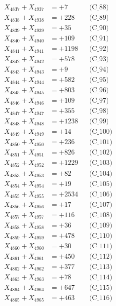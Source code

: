 \documentclass[a4paper,10pt]{article}
\begin{document}
{\begin{align}
X_{4837} + X_{4937} &= +7 && \text{(C\_88)} \\
X_{4838} + X_{4938} &= +228 && \text{(C\_89)} \\
X_{4839} + X_{4939} &= +35 && \text{(C\_90)} \\
\allowbreak
X_{4840} + X_{4940} &= +109 && \text{(C\_91)} \\
X_{4841} + X_{4941} &= +1198 && \text{(C\_92)} \\
X_{4842} + X_{4942} &= +578 && \text{(C\_93)} \\
X_{4843} + X_{4943} &= +9 && \text{(C\_94)} \\
X_{4844} + X_{4944} &= +582 && \text{(C\_95)} \\
\allowbreak
X_{4845} + X_{4945} &= +803 && \text{(C\_96)} \\
X_{4846} + X_{4946} &= +109 && \text{(C\_97)} \\
X_{4847} + X_{4947} &= +355 && \text{(C\_98)} \\
X_{4848} + X_{4948} &= +1238 && \text{(C\_99)} \\
X_{4849} + X_{4949} &= +14 && \text{(C\_100)} \\
\allowbreak
X_{4850} + X_{4950} &= +236 && \text{(C\_101)} \\
X_{4851} + X_{4951} &= +826 && \text{(C\_102)} \\
X_{4852} + X_{4952} &= +1229 && \text{(C\_103)} \\
X_{4853} + X_{4953} &= +82 && \text{(C\_104)} \\
X_{4854} + X_{4954} &= +19 && \text{(C\_105)} \\
\allowbreak
X_{4855} + X_{4955} &= +2534 && \text{(C\_106)} \\
X_{4856} + X_{4956} &= +17 && \text{(C\_107)} \\
X_{4857} + X_{4957} &= +116 && \text{(C\_108)} \\
X_{4858} + X_{4958} &= +36 && \text{(C\_109)} \\
X_{4859} + X_{4959} &= +478 && \text{(C\_110)} \\
\allowbreak
X_{4860} + X_{4960} &= +30 && \text{(C\_111)} \\
X_{4861} + X_{4961} &= +450 && \text{(C\_112)} \\
X_{4862} + X_{4962} &= +377 && \text{(C\_113)} \\
X_{4863} + X_{4963} &= +78 && \text{(C\_114)} \\
X_{4864} + X_{4964} &= +647 && \text{(C\_115)} \\
\allowbreak
X_{4865} + X_{4965} &= +463 && \text{(C\_116)} \\

\end{align}}
\end{document}
